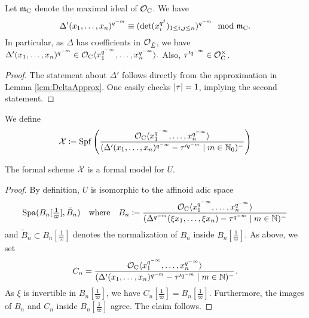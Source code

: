 \documentclass[../main.tex]{subfiles}
\begin{document}
\begin{lem}\label{lem:PropsOfDeltaPrAndTauPr}
  Let $\mathfrak{m}_{\mathrm{C}}$ denote the maximal ideal of $\mathcal{O}_{\mathrm{C}}$. We have
  \begin{equation*}
    \Delta'(x_1, \dots, x_n)^{q^{-m}} \equiv (\det(x_i^{q^j})_{1 \leq i,j \leq
    n})^{q^{-m}} \mod {\mathfrak{m}}_{\mathrm{C}}.
  \end{equation*}
  In particular, as $\Delta$ has coefficients in $\mathcal{O}_{\breve {E}}$, we have 
  $\Delta'(x_1, \dots, x_n)^{q^{-m}} \in \mathcal{O}_{\mathrm{C}} \langle x_1^{q^{-\infty}}, \dots
  , x_n^{q^{-\infty}}\rangle.$
  Also, $\tau'^{q^{-m}} \in \mathcal{O}_{\mathrm{C}}^\times$. 
\begin{proof}
  The statement about $\Delta'$ follows directly from the approximation in Lemma
  \ref{lem:DeltaApprox}. One easily checks $\lvert \tau \rvert = 1$, implying the second
  statement.
\end{proof}
\end{lem}

We define 
\begin{equation*}
  \mathcal{X} \coloneq \operatorname{Spf} \left(
    \frac
    {\mathcal{O}_{\mathrm{C}} \langle x_1^{q^{-\infty}}, \dots , x_n^{q^{-\infty}}
      \rangle}
    {(\Delta'(x_1, \dots, x_n)^{q^{-m}} - \tau'^{q^{-m}} \mid m \in \mathbb{N}_0)^-
      }\right)
\end{equation*}

\begin{prop}\label{prop:AffinoidIsFormalModel}
  The formal scheme $\mathcal{X}$ is a formal model for $U$. 
\end{prop}
\begin{proof} 
  By definition, $U$ is isomorphic to the affinoid adic space
  \begin{equation*}
    \operatorname{Spa}(B_n[\tfrac 1\varpi], \tilde B_n) \quad \text{where} \quad 
    B_n \coloneqq \frac{\mathcal{O}_{\mathrm{C}} \langle x_1^{q^{-\infty}}, \dots,
    x_n^{q^{-\infty}} \rangle}
    {(\Delta^{q^{-m}}(\xi x_1, \dots, \xi x_n) - \tau^{q^{-m}} \mid m \in \mathbb{N})^-}
  \end{equation*}
  and $\tilde B_n \subset B_n[\tfrac 1\varpi]$ denotes the normalization of 
  $B_n$ inside $B_n[\tfrac 1 \varpi]$. 
  As above, we set 
  $$C_n = \frac{\mathcal{O}_{\mathrm{C}} \langle x_1^{q^{-\infty}}, \dots,
  x_n^{q^{-\infty}} \rangle} {(\Delta'(x_1, \dots, x_n)^{q^{-m}} -
  \tau'^{q^{-m}} \mid m \in \mathbb{N})^-}.$$
  As $\xi$ is invertible in $B_n[\tfrac 1 \varpi]$, we have 
  $C_n[\tfrac 1 \varpi] = B_n[\tfrac 1 \varpi]$. Furthermore, the images of 
  $B_n$ and $C_n$ inside $B_n[\tfrac 1 \varpi]$ agree. The claim follows.
\end{proof}
\end{document}
